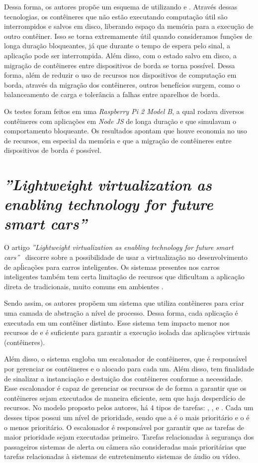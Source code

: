 Dessa forma, os autores propõe um esquema de \checkpointing utilizando \docker e \criu. Através dessas tecnologias, os contêineres que não estão executando computação útil são interrompidos e salvos em disco, liberando espaço da memória para a execução de outro contêiner. Isso se torna extremamente útil quando consideramos funções de longa duração bloqueantes, já que durante o tempo de espera pelo sinal, a aplicação pode ser interrompida. Além disso, com o estado salvo em disco, a migração de contêineres entre dispositivos \iot de borda se torna possível. Dessa forma, além de reduzir o uso de recursos nos dispositivos de computação em borda, através da migração dos contêineres, outros benefícios surgem, como o balanceamento de carga e tolerância a falhas entre aparelhos \iot de borda.

Os testes foram feitos em uma \textit{Raspberry Pi 2 Model B}, a qual rodava diversos contêineres com aplicações em \textit{Node JS} de longa duração e que simulavam o comportamento bloqueante. Os resultados apontam que houve economia no uso de recursos, em especial da memória e que a migração de contêineres entre dispositivos \iot de borda é possível.

\section{ \textit{''Lightweight virtualization as enabling technology for future smart cars''}}

O artigo \textit{''Lightweight virtualization as enabling technology for future smart cars''}~\cite{smartcarslwvirtualization} discorre sobre a possibilidade de usar a virtualização no desenvolvimento de apĺicações para carros inteligentes. Os sistemas presentes nos carros inteligentes também tem certa limitação de recursos que dificultam a aplicação direta de \hypervisors tradicionais, muito comuns em ambientes \cloud.

Sendo assim, os autores propõem um sistema que utiliza contêineres \docker para criar uma camada de abstração a nível de processo. Dessa forma, cada aplicação é executada em um contêiner distinto. Esse sistema tem impacto menor nos recursos de \hardware e é suficiente para garantir a execução isolada das aplicações virtuais (contêineres).

Além disso, o sistema engloba um escalonador de contêineres, que é responsável por gerenciar os contêineres e o \hardware alocado para cada um. Além disso, tem finalidade de sinalizar a instanciação e destuição dos contêineres conforme a necessidade. Esse escalonador é capaz de gerenciar os recursos de \hardware de forma a garantir que os contêineres sejam executados de maneira eficiente, sem que haja desperdício de recursos. No modelo proposto pelos autores, há 4 tipos de tarefas: \critical, \high, \moderate e \low. Cada um desses tipos possui um nível de prioridade, sendo que a \critical é o mais prioritário e o \low é o menos prioritário. O escalonador é responsável por garantir que as tarefas de maior prioridade sejam executadas primeiro. Tarefas relacionadas à segurança dos passageiros \eg sistemas de alerta ou câmera são consideradas mais prioritárias que tarefas relacionadas à sistemas de entretenimento \eg sistemas de áudio ou vídeo.

